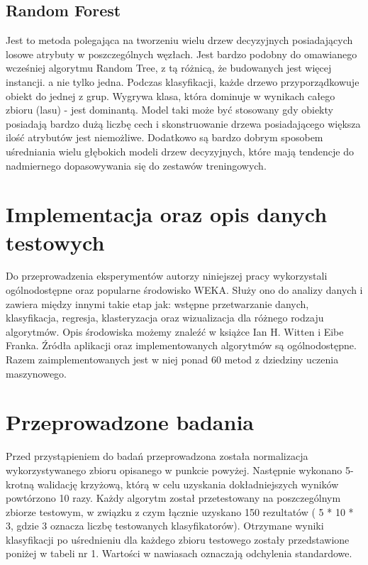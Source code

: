\documentclass[conference]{IEEEtran}
\begin{document}
\subsection{Random Forest}
Jest to metoda polegająca na tworzeniu wielu drzew decyzyjnych posiadających losowe atrybuty w poszczególnych węzłach. Jest bardzo podobny do omawianego wcześniej algorytmu Random Tree, z  tą różnicą, że budowanych jest więcej instancji. a nie tylko jedna. Podczas klasyfikacji, każde drzewo przyporządkowuje obiekt do jednej z grup. Wygrywa klasa, która dominuje w wynikach całego zbioru (lasu) - jest dominantą. Model taki może być stosowany gdy obiekty posiadają bardzo dużą liczbę cech i skonstruowanie drzewa posiadającego większa ilość atrybutów  jest niemożliwe. Dodatkowo są bardzo dobrym sposobem uśredniania wielu głębokich modeli drzew decyzyjnych, które mają tendencje do nadmiernego dopasowywania się do zestawów treningowych.

\section{Implementacja oraz opis danych testowych}
Do przeprowadzenia eksperymentów autorzy niniejszej pracy wykorzystali ogólnodostępne oraz popularne środowisko WEKA. Służy ono do analizy danych i zawiera między innymi takie etap jak: wstępne przetwarzanie danych, klasyfikacja, regresja, klasteryzacja oraz wizualizacja dla różnego rodzaju algorytmów. Opis środowiska możemy znaleźć w książce Ian H. Witten i Eibe Franka. Źródła aplikacji oraz implementowanych algorytmów są ogólnodostępne. Razem zaimplementowanych jest w niej ponad 60 metod z dziedziny uczenia maszynowego. 


\section{Przeprowadzone badania}
Przed przystąpieniem do badań przeprowadzona została normalizacja wykorzystywanego zbioru opisanego w punkcie powyżej. Następnie wykonano 5-krotną walidację krzyżową, którą w celu uzyskania dokładniejszych wyników powtórzono 10 razy. Każdy algorytm został przetestowany na poszczególnym zbiorze testowym, w związku z czym łącznie uzyskano 150 rezultatów ( 5 * 10 * 3, gdzie 3 oznacza liczbę testowanych klasyfikatorów). Otrzymane wyniki klasyfikacji po uśrednieniu dla każdego zbioru testowego zostały przedstawione poniżej w tabeli nr 1. Wartości w nawiasach oznaczają odchylenia standardowe.
\end{document}
